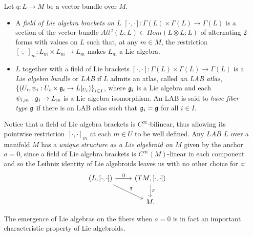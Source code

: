 \begin{definition}\label{defnLAB}
    Let $q:L \to M$ be a vector bundle over $M$.
    
    \begin{itemize}
    
    \item A \emph{field of Lie algebra brackets on $L$} $[\cdot, \cdot]:\Gamma(L) \times \Gamma(L) \to \Gamma(L)$ is a section of the vector bundle $Alt^2(L; L) \subset Hom(L \otimes L; L)$ of alternating $2$-forms with values on $L$ such that, at any $m \in M$, the restriction $[\cdot, \cdot]_m:L_m \times L_m \to L_m$ makes $L_m$ a Lie algebra.
    
    \item $L$ together with a field of Lie brackets $[\cdot, \cdot]:\Gamma(L) \times \Gamma(L) \to \Gamma(L)$ is a \emph{Lie algebra bundle} or \emph{LAB} if $L$ admits an atlas, called \emph{an LAB atlas}, $\left\{ (U_i, \psi_i: U_i \times \mathfrak{g}_i \to L|_{U_i}) \right\}_{i \in I}$, where $\mathfrak{g}_i$ is a Lie algebra and each $\psi_{i, m}: \mathfrak{g}_i \to L_m$ is a Lie algebra isomorphism. An LAB is said to \emph{have fiber type $\mathfrak{g}$} if there is an LAB atlas such that $\mathfrak{g}_i = \mathfrak{g}$ for all $i \in I$.
    
    \end{itemize}
    
\end{definition}
Notice that a field of Lie algebra brackets is $C^\infty$-bilinear, thus allowing its pointwise restriction $[\cdot, \cdot]_m$ at each $m \in U$ to be well defined. Any $LAB$ $L$ over a manifold $M$ has a \emph{unique structure as a Lie algebroid on $M$} given by the anchor $a = 0$, since a field of Lie algebra brackets is $C^\infty(M)$-linear in each component and so the Leibniz identity of Lie algebroids leaves us with no other choice for $a$:
\begin{equation}\label{diagramLABIsAlgebroid}
    \begin{tikzcd}
    (L, [\cdot, \cdot]) \arrow{r}{0} \arrow{dr}{q} & (TM, [\cdot, \cdot]) \arrow{d}{\pi}\\
    & M.
    \end{tikzcd}
\end{equation}

The emergence of Lie algebras on the fibers when $a = 0$ is in fact an important characteristic property of Lie algebroids.

